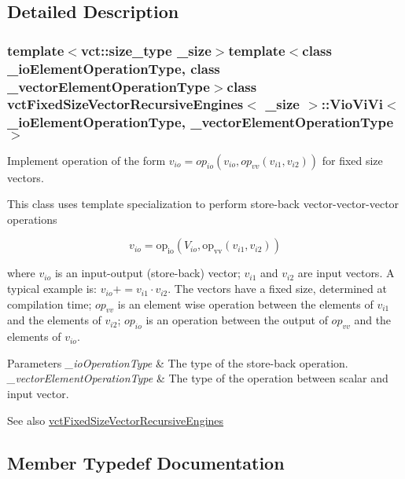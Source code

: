 \subsection{Detailed Description}
\subsubsection*{template$<$vct\+::size\+\_\+type \+\_\+size$>$template$<$class \+\_\+io\+Element\+Operation\+Type, class \+\_\+vector\+Element\+Operation\+Type$>$class vct\+Fixed\+Size\+Vector\+Recursive\+Engines$<$ \+\_\+size $>$\+::\+Vio\+Vi\+Vi$<$ \+\_\+io\+Element\+Operation\+Type, \+\_\+vector\+Element\+Operation\+Type $>$}

Implement operation of the form $v_{io} = op_{io}(v_{io}, op_{vv}(v_{i1}, v_{i2}))$ for fixed size vectors. 

This class uses template specialization to perform store-\/back vector-\/vector-\/vector operations

\[ v_{io} = \mathrm{op_{io}}(V_{io}, \mathrm{op_{vv}}(v_{i1}, v_{i2})) \]

where $v_{io}$ is an input-\/output (store-\/back) vector; $v_{i1}$ and $v_{i2}$ are input vectors. A typical example is\+: $v_{io} += v_{i1} \cdot v_{i2}$. The vectors have a fixed size, determined at compilation time; $op_{vv}$ is an element wise operation between the elements of $v_{i1}$ and the elements of $v_{i2}$; $op_{io}$ is an operation between the output of $op_{vv}$ and the elements of $v_{io}$.


\begin{DoxyParams}{Parameters}
{\em \+\_\+io\+Operation\+Type} & The type of the store-\/back operation.\\
\hline
{\em \+\_\+vector\+Element\+Operation\+Type} & The type of the operation between scalar and input vector.\\
\hline
\end{DoxyParams}
\begin{DoxySeeAlso}{See also}
\hyperlink{classvct_fixed_size_vector_recursive_engines}{vct\+Fixed\+Size\+Vector\+Recursive\+Engines} 
\end{DoxySeeAlso}


\subsection{Member Typedef Documentation}
\hypertarget{classvct_fixed_size_vector_recursive_engines_1_1_vio_vi_vi_af67bb1f70825ededcfe0b1cc9b02241b}{}
